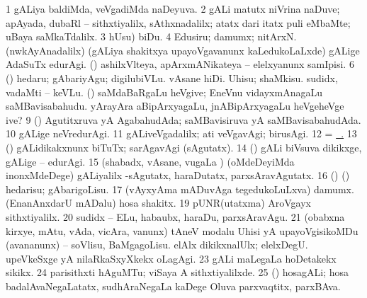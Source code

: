 {{{{{{\noindent 
\gl{\pagu}
\bmng
\bnum
\num{1}  gALiya baldiMda, veVgadiMda naDeyuva. 
\num{2} gALi matutx niVrina naDuve; apAyada, dubaRl -- sithxtiyalilx, sAthxnadalilx; atatx dari itatx puli eMbaMte; uBaya saMkaTdalilx. 
\num{3}  hUsu) biDu. 
\num{4}  Edusiru; damumx; nitArxN. 
\hypertarget{wind pagu5}{} 
  
\banum
{} (nwkAyAnadalilx) (gALiya shakitxya upayoVgavanunx kaLedukoLaLxde) gALige AdaSuTx edurAgi. 
 (\rUpa) ashilxVlteya, apArxmANikateya -- elelxyanunx samIpisi. 
\eanum
\numie
\num{6}  (\AmA) hedaru; gAbariyAgu; digilubiVLu. 
  
\banum
{} vAsane hiDi. 
 Uhisu; shaMkisu. 
 sudidx, vadaMti -- keVLu. 
\eanum
\numie
{}  (\rUpa) 
\banum
{} saMdaBaRgaLu heVgive; EneVnu vidayxmAnagaLu saMBavisabahudu. 
 yArayAra aBipArxyagaLu, jnABipArxyagaLu heVgeheVge ive? 
\eanum
\numie
\num{9} (\rUpa) Agutitxruva yA AgabahudAda; saMBavisiruva yA saMBavisabahudAda. 
\num{10}  gALige neVredurAgi. 
\num{11}  gALiveVgadalilx; ati veVgavAgi; birusAgi. 
\num{12}  = \hyperlink{wind pagu5}{\pagu\ .} 
\num{13}  (\nw) gALidikakxnunx biTuTx; sarAgavAgi (sAgutatx). 
\num{14}  (\nw) gALi biVsuva dikikxge, gALige -- edurAgi. 
\num{15}  (shabadx, vAsane, \mo vugaLa \vi) (oMdeDeyiMda inonxMdeDege) gALiyalilx -sAgutatx, haraDutatx, parxsAravAgutatx. 
\num{16}  (\AmA) (\ashi) hedarisu; gAbarigoLisu. 
\num{17}  
  
\banum
{} (vAyxyAma mADuvAga tegedukoLuLxva) damumx. 
 (EnanAnxdarU mADalu) hosa shakitx. 
\eanum
\numie
\num{19}  pUNR(utatxma) AroVgayx sithxtiyalilx. 
\num{20}  sudidx -- ELu, habaubx, haraDu, parxsAravAgu. 
\num{21}  (obabxna kirxye, mAtu, vAda, vicAra, \mo vanunx) tAneV modalu Uhisi yA upayoVgisikoMDu (avananunx) -- soVlisu, BaMgagoLisu. 
  
\banum
{} elAlx dikikxnalUlx; elelxDegU. 
 upeVkeSxge yA nilaRkaSxyXkekx oLagAgi. 
\eanum
\numie
\num{23}  gALi maLegaLa hoDetakekx sikikx. 
\num{24}  parisithxti hAguMTu; viSaya A sithxtiyalilxde. 
\num{25}  (\rUpa) hosagALi; hosa badalAvaNegaLatatx, sudhAraNegaLa kaDege Oluva parxvaqtitx, parxBAva. 
\enum
\emng
\eentry

}}}}}}
